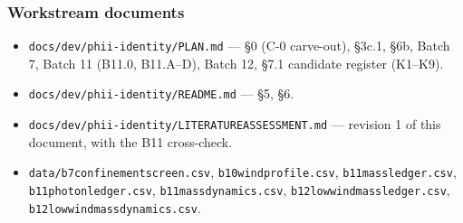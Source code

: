 \documentclass[11pt,a4paper,oneside]{report}
\newcommand{\brkus}{\textunderscore\allowbreak}
\newcommand{\code}[1]{\texttt{\small\let\_\brkus #1}}
\begin{document}
\subsubsection*{Workstream documents}
\begin{itemize}\small\raggedright
\item \code{docs/dev/phii-identity/PLAN.md} --- \S0 (C-0 carve-out), \S3c.1, \S6b, Batch 7,
      Batch 11 (B11.0, B11.A--D), Batch 12, \S7.1 candidate register (K1--K9).
\item \code{docs/dev/phii-identity/README.md} --- \S5, \S6.
\item \code{docs/dev/phii-identity/LITERATURE\_ASSESSMENT.md} --- revision 1 of this document,
      with the B11 cross-check.
\item \code{data/b7\_confinement\_screen.csv}, \code{b10\_wind\_profile.csv},
      \code{b11\_mass\_ledger.csv}, \code{b11\_photon\_ledger.csv},
      \code{b11\_mass\_dynamics.csv}, \code{b12\_lowwind\_mass\_ledger.csv},
      \code{b12\_lowwind\_mass\_dynamics.csv}.
\end{itemize}
\end{document}
